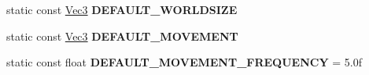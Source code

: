 \begin{DoxyCompactItemize}
\item 
\mbox{\label{classPUForceFieldAffector_abe022d96e5f14fe3251f5e245c444ce2}} 
static const \hyperlink{classVec3}{Vec3} {\bfseries D\+E\+F\+A\+U\+L\+T\+\_\+\+W\+O\+R\+L\+D\+S\+I\+ZE}
\item 
\mbox{\label{classPUForceFieldAffector_ac035b9a6653f37e6c6c54951c8775383}} 
static const \hyperlink{classVec3}{Vec3} {\bfseries D\+E\+F\+A\+U\+L\+T\+\_\+\+M\+O\+V\+E\+M\+E\+NT}
\item 
\mbox{\label{classPUForceFieldAffector_ab2fcefa7de397e45888c2ab2c6fc1469}} 
static const float {\bfseries D\+E\+F\+A\+U\+L\+T\+\_\+\+M\+O\+V\+E\+M\+E\+N\+T\+\_\+\+F\+R\+E\+Q\+U\+E\+N\+CY} = 5.\+0f
\end{DoxyCompactItemize}
